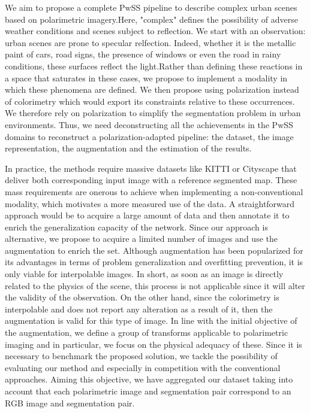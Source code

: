 We aim to propose a complete PwSS pipeline to describe complex urban scenes based on polarimetric imagery.Here, "complex" defines the possibility of adverse weather conditions and scenes subject to reflection. We start with an observation: urban scenes are prone to specular relfection. Indeed, whether it is the metallic paint of cars, road signs, the presence of windows or even the road in rainy conditions, these surfaces reflect the light.Rather than defining these reactions in a space that saturates in these cases, we propose to implement a modality in which these phenomena are defined.
We then propose using polarization instead of colorimetry which would export its constraints relative to these occurrences. We therefore rely on polarization to simplify the segmentation problem in urban environments.
Thus, we need deconstructing all the achievements in the PwSS domains to reconstruct a polarization-adapted pipeline: the dataset, the image representation, the augmentation and the estimation of the results.

In practice, the methods require massive datasets like KITTI \cite{Geiger2012CVPR} or Cityscape \cite{Cordts2016Cityscapes} that deliver both corresponding input image with a reference segmented map.
These mass requirements are onerous to achieve when implementing a non-conventional modality, which motivates a more measured use of the data.
A straightforward approach would be to acquire a large amount of data and then annotate it to enrich the generalization capacity of the network. Since our approach is alternative, we propose to acquire a limited number of images and use the augmentation to enrich the set.
Although augmentation has been popularized for its advantages in terms of problem generalization and overfitting prevention, it is only viable for interpolable images. In short, as soon as an image is directly related to the physics of the scene, this process is not applicable since it will alter the validity of the observation. On the other hand, since the colorimetry is interpolable and does not report any alteration as a result of it, then the augmentation is valid for this type of image.
In line with the initial objective of the augmentation, we define a group of transforms applicable to polarimetric imaging and in particular, we focus on the physical adequacy of these.
Since it is necessary to benchmark the proposed solution, we tackle the possibility of evaluating our method and especially in competition with the conventional approaches. Aiming this objective, we have aggregated our dataset taking into account that each polarimetric image and segmentation pair correspond to an RGB image and segmentation pair. 
 
